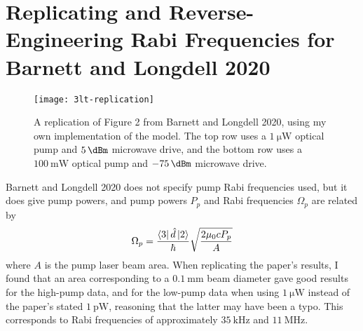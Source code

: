 \chapter{\label{ap:barnett_longdell_reverse}Replicating and Reverse-Engineering Rabi Frequencies for Barnett and Longdell 2020}

\begin{figure}[h]
\centering
\texttt{[image: 3lt-replication]}
\caption{\label{fig:3lt_replication} A replication of Figure 2 from Barnett and Longdell 2020\cite{barnett_longdell_2020}, using my own implementation of the model. The top row uses a $\qty{1}{\micro\watt}$ optical pump and $\qty{5}{\dBm}$ microwave drive, and the bottom row uses a $\qty{100}{\milli\watt}$ optical pump and $\qty{-75}{\dBm}$ microwave drive.}
\end{figure}

Barnett and Longdell 2020\cite{barnett_longdell_2020} does not specify pump Rabi frequencies used, but it does give pump powers, and pump powers $P_p$ and Rabi frequencies $\Omega_p$ are related by
\begin{equation}
    \Omega_p = \frac{\left\langle3\right|\hat{d}\left|2\right\rangle}{\hbar} \sqrt{\frac{2\mu_0cP_p}{A}}
\end{equation}
where $A$ is the pump laser beam area. When replicating the paper's results, I found that an area corresponding to a $\qty{0.1}{\milli\metre}$ beam diameter gave good results for the high-pump data, and for the low-pump data when using $\qty{1}{\micro\watt}$ instead of the paper's stated $\qty{1}{\pico\watt}$, reasoning that the latter may have been a typo. This corresponds to Rabi frequencies of approximately $\qty{35}{\kilo\hertz}$ and $\qty{11}{\mega\hertz}$.
